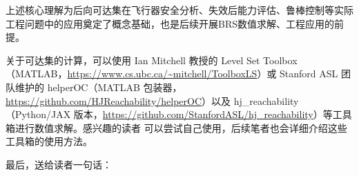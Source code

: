 \documentclass[11pt]{ctexrep}
\begin{document}
上述核心理解为后向可达集在飞行器安全分析、失效后能力评估、鲁棒控制等实际工程问题中的应用奠定了概念基础，也是后续开展BRS数值求解、工程应用的前提。

关于可达集的计算，可以使用 Ian Mitchell 教授的 Level Set Toolbox（MATLAB，\url{https://www.cs.ubc.ca/~mitchell/ToolboxLS}）或
Stanford ASL 团队维护的 helperOC（MATLAB 包装器，\url{https://github.com/HJReachability/helperOC}）以及
hj\_reachability（Python/JAX 版本，\url{https://github.com/StanfordASL/hj_reachability}）等工具箱进行数值求解。感兴趣的读者
可以尝试自己使用，后续笔者也会详细介绍这些工具箱的使用方法。

最后，送给读者一句话：

\vspace{3ex}

\noindent
{}



\end{document}

